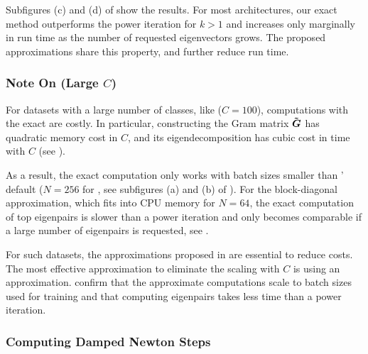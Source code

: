 Subfigures (c) and (d) of
show the results. For most architectures, our exact method outperforms the power
iteration for $k>1$ and increases only marginally in run time as the number of
requested eigenvectors grows. The proposed approximations share this property,
and further reduce run time.

\subsubsection{Note On \cifarhun (Large $C$)}

For datasets with a large number of classes, like \cifarhun ($C=100$),
computations with the exact \ggn are costly. In particular, constructing the
Gram matrix $\bm{\tilde{{\bm{G}}}}$ has quadratic memory cost in $C$, and its
eigendecomposition has cubic cost in time with $C$ (see
).

As a result, the exact computation only works with batch sizes smaller than
\deepobs' default ($N=256$ for \cifarhun, see subfigures (a) and (b) of
).
For the \ggn block-diagonal approximation, which fits into CPU memory for
$N=64$, the exact computation of top eigenpairs is slower than a power iteration
and only becomes comparable if a large number of eigenpairs is requested, see
.

For such datasets, the approximations proposed in  are
essential to reduce costs. The most effective approximation to eliminate the
scaling with $C$ is using an \mc approximation.
confirm that the approximate computations scale to batch sizes used for training
and that computing eigenpairs takes less time than a power iteration.



\subsubsection{Computing Damped Newton Steps}

